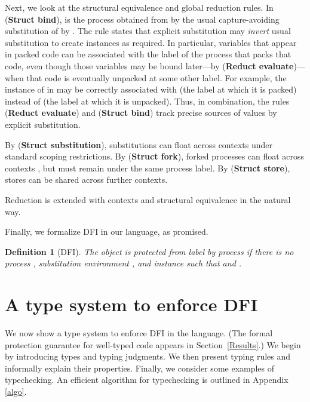 \documentclass{sigplanconf}
\newcommand{\srule}[1]{\textbf{Struct #1}}
\newcommand{\rrule}[1]{\textbf{Reduct #1}}
\newtheorem{definition}{Definition}[section]
\begin{document}
Next, we look at the structural
equivalence and global reduction rules. In (\srule{bind}),  is the process obtained from  by the usual capture-avoiding substitution of  by . The rule states that explicit substitution may \emph{invert} usual substitution to create instances as required. In particular, variables that appear in packed code can be associated with the label of the process that packs that code, even though those variables may be bound later---by (\rrule{evaluate})---when that code is eventually unpacked at some other label. For example, the instance of  in  may be correctly associated with  (the label at which it is packed) instead of  (the label at which it is unpacked). Thus, in combination, the rules (\rrule{evaluate}) and (\srule{bind}) track precise sources of values by explicit substitution. 


By (\srule{substitution}), substitutions can float across contexts under standard scoping restrictions. 
By (\srule{fork}), forked processes can float across contexts \cite{gordon98concurrent}, but must remain under the same
process label. By (\srule{store}), stores can be shared across further contexts. 

Reduction is extended with contexts and structural equivalence in the natural way.


Finally, we formalize DFI in our language, as promised. 
\begin{definition}[DFI]\label{locintdef1} The object  is protected from label  by process 
  if there is no process , substitution environment , and instance  such that  and .
\end{definition}


\section{A type system to enforce DFI}\label{typ}
We now show a type system to enforce DFI in the language. (The formal protection guarantee for well-typed code appears in Section~\ref{Results}.) We begin by introducing types and typing
judgments. We then present typing rules and informally
explain their properties. Finally, we consider some examples of typechecking. An efficient algorithm for typechecking is outlined in Appendix \ref{algo}. 
\end{document}

